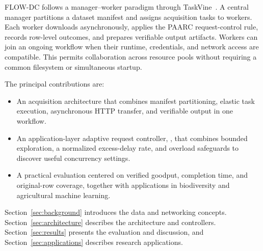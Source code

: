 FLOW-DC follows a manager--worker paradigm through TaskVine~\cite{taskvine}. A central manager partitions a dataset manifest and assigns acquisition tasks to workers. Each worker downloads asynchronously, applies the PAARC request-control rule, records row-level outcomes, and prepares verifiable output artifacts. Workers can join an ongoing workflow when their runtime, credentials, and network access are compatible. This permits collaboration across resource pools without requiring a common filesystem or simultaneous startup.

The principal contributions are:
\begin{itemize}
\item An acquisition architecture that combines manifest partitioning, elastic task execution, asynchronous HTTP transfer, and verifiable output in one workflow.
\item An application-layer adaptive request controller, \paarc{}, that combines bounded exploration, a normalized excess-delay rate, and overload safeguards to discover useful concurrency settings.
\item A practical evaluation centered on verified goodput, completion time, and original-row coverage, together with applications in biodiversity and agricultural machine learning.
\end{itemize}
Section~\ref{sec:background} introduces the data and networking concepts. Section~\ref{sec:architecture} describes the architecture and controllers. Section~\ref{sec:results} presents the evaluation and discussion, and Section~\ref{sec:applications} describes research applications.
